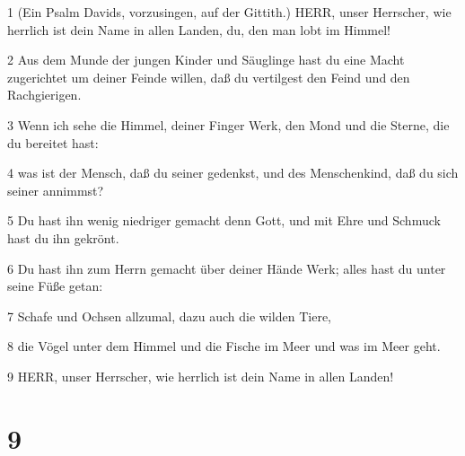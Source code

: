 \par 1 (Ein Psalm Davids, vorzusingen, auf der Gittith.) HERR, unser Herrscher, wie herrlich ist dein Name in allen Landen, du, den man lobt im Himmel!
\par 2 Aus dem Munde der jungen Kinder und Säuglinge hast du eine Macht zugerichtet um deiner Feinde willen, daß du vertilgest den Feind und den Rachgierigen.
\par 3 Wenn ich sehe die Himmel, deiner Finger Werk, den Mond und die Sterne, die du bereitet hast:
\par 4 was ist der Mensch, daß du seiner gedenkst, und des Menschenkind, daß du sich seiner annimmst?
\par 5 Du hast ihn wenig niedriger gemacht denn Gott, und mit Ehre und Schmuck hast du ihn gekrönt.
\par 6 Du hast ihn zum Herrn gemacht über deiner Hände Werk; alles hast du unter seine Füße getan:
\par 7 Schafe und Ochsen allzumal, dazu auch die wilden Tiere,
\par 8 die Vögel unter dem Himmel und die Fische im Meer und was im Meer geht.
\par 9 HERR, unser Herrscher, wie herrlich ist dein Name in allen Landen!

\chapter{9}

